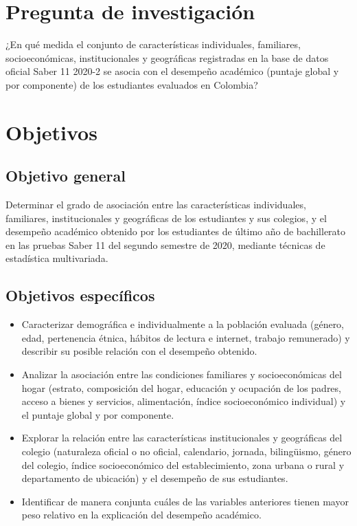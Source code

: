 \documentclass[12pt]{article}
\begin{document}
\section{Pregunta de investigación}
¿En qué medida el conjunto de características individuales, familiares, socioeconómicas, institucionales y geográficas registradas en la base de datos oficial Saber 11 2020-2 se asocia con el desempeño académico (puntaje global y por componente) de los estudiantes evaluados en Colombia?

\section{Objetivos}

\subsection{Objetivo general}
Determinar el grado de asociación entre las características individuales, familiares, institucionales y geográficas de los estudiantes y sus colegios, y el desempeño académico obtenido por los estudiantes de último año de bachillerato en las pruebas Saber 11 del segundo semestre de 2020, mediante técnicas de estadística multivariada.

\subsection{Objetivos específicos}
\begin{itemize}[leftmargin=1.8em, itemsep=0.4em, topsep=0.3em]
    \item Caracterizar demográfica e individualmente a la población evaluada (género, edad, pertenencia étnica, hábitos de lectura e internet, trabajo remunerado) y describir su posible relación con el desempeño obtenido.

    \item Analizar la asociación entre las condiciones familiares y socioeconómicas del hogar (estrato, composición del hogar, educación y ocupación de los padres, acceso a bienes y servicios, alimentación, índice socioeconómico individual) y el puntaje global y por componente.

    \item Explorar la relación entre las características institucionales y geográficas del colegio (naturaleza oficial o no oficial, calendario, jornada, bilingüismo, género del colegio, índice socioeconómico del establecimiento, zona urbana o rural y departamento de ubicación) y el desempeño de sus estudiantes.

    \item Identificar de manera conjunta cuáles de las variables anteriores tienen mayor peso relativo en la explicación del desempeño académico.
\end{itemize}
\end{document}
